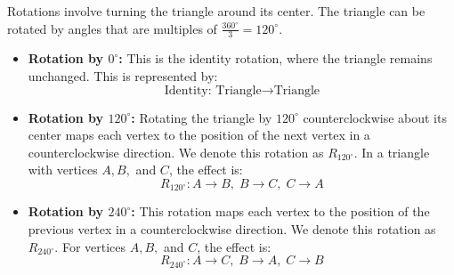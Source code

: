 Rotations involve turning the triangle around its center. The triangle can be rotated by angles that are multiples of \( \frac{360^\circ}{3} = 120^\circ \).

\begin{itemize}
    \item \textbf{Rotation by \( 0^\circ \):} This is the identity rotation, where the triangle remains unchanged. This is represented by:
    \[
    \text{Identity: } \text{Triangle} \rightarrow \text{Triangle}
    \]
    
    \item \textbf{Rotation by \( 120^\circ \):} Rotating the triangle by \( 120^\circ \) counterclockwise about its center maps each vertex to the position of the next vertex in a counterclockwise direction. We denote this rotation as \( R_{120^\circ} \). In a triangle with vertices \( A, B, \) and \( C \), the effect is:
    \[
    R_{120^\circ}: A \rightarrow B, \; B \rightarrow C, \; C \rightarrow A
    \]
    
    \item \textbf{Rotation by \( 240^\circ \):} This rotation maps each vertex to the position of the previous vertex in a counterclockwise direction. We denote this rotation as \( R_{240^\circ} \). For vertices \( A, B, \) and \( C \), the effect is:
    \[
    R_{240^\circ}: A \rightarrow C, \; B \rightarrow A, \; C \rightarrow B
    \]
\end{itemize}

\begin{center}
\end{center}

